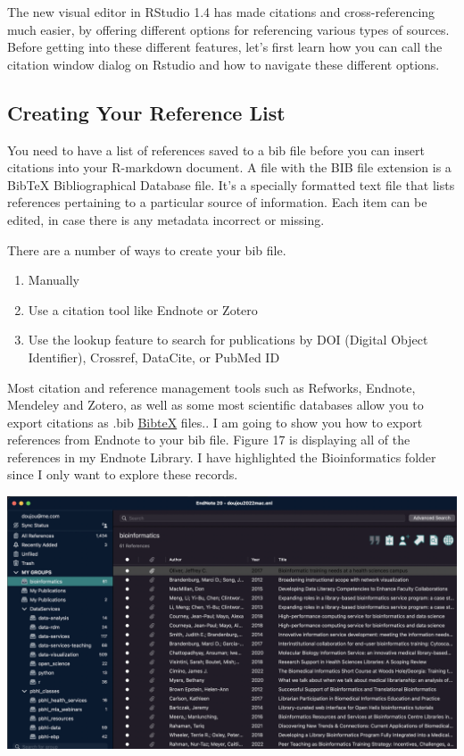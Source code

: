 \documentclass[
]{article}
\providecommand{\tightlist}{%
  \setlength{\itemsep}{0pt}\setlength{\parskip}{0pt}}
\begin{document}
The new visual editor in RStudio 1.4 has made citations and
cross-referencing much easier, by offering different options for
referencing various types of sources. Before getting into these
different features, let's first learn how you can call the citation
window dialog on Rstudio and how to navigate these different options.

\hypertarget{creating-your-reference-list}{%
\subsection{Creating Your Reference
List}\label{creating-your-reference-list}}

You need to have a list of references saved to a bib file before you can
insert citations into your R-markdown document. A file with the BIB file
extension is a BibTeX Bibliographical Database file. It's a specially
formatted text file that lists references pertaining to a particular
source of information. Each item can be edited, in case there is any
metadata incorrect or missing.

There are a number of ways to create your bib file.

\begin{enumerate}
\def\labelenumi{\arabic{enumi}.}
\tightlist
\item
  Manually
\item
  Use a citation tool like Endnote or Zotero
\item
  Use the lookup feature to search for publications by DOI (Digital
  Object Identifier), Crossref, DataCite, or PubMed ID
\end{enumerate}

Most citation and reference management tools such as Refworks, Endnote,
Mendeley and Zotero, as well as some most scientific databases allow you
to export citations as .bib
\href{https://en.wikipedia.org/wiki/BibTeX}{BibteX} files.. I am going
to show you how to export references from Endnote to your bib file.
Figure 17 is displaying all of the references in my Endnote Library. I
have highlighted the Bioinformatics folder since I only want to explore
these records.

\includegraphics[width=6.66667in,height=\textheight]{images/bib-01.png}
\end{document}
